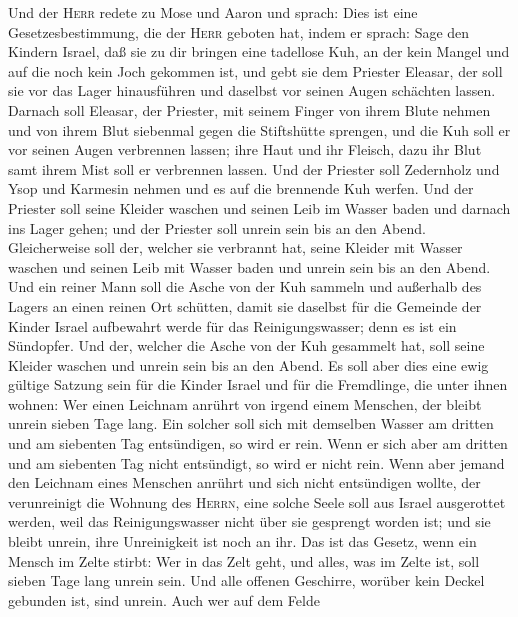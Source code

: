  Und der \textsc{Herr} redete zu Mose und Aaron und
sprach:  Dies ist eine Gesetzesbestimmung, die der
\textsc{Herr} geboten hat, indem er sprach: Sage den Kindern Israel, daß
sie zu dir bringen eine tadellose Kuh, an der kein Mangel und auf die
noch kein Joch gekommen ist, und gebt sie dem Priester Eleasar,
 der soll sie vor das Lager hinausführen und daselbst vor
seinen Augen schächten lassen.  Darnach soll Eleasar, der
Priester, mit seinem Finger von ihrem Blute nehmen und von ihrem Blut
siebenmal gegen die Stiftshütte sprengen,  und die Kuh
soll er vor seinen Augen verbrennen lassen; ihre Haut und ihr Fleisch,
dazu ihr Blut samt ihrem Mist soll er verbrennen lassen. 
Und der Priester soll Zedernholz und Ysop und Karmesin nehmen und es auf
die brennende Kuh werfen.  Und der Priester soll seine
Kleider waschen und seinen Leib im Wasser baden und darnach ins Lager
gehen; und der Priester soll unrein sein bis an den Abend.
 Gleicherweise soll der, welcher sie verbrannt hat, seine
Kleider mit Wasser waschen und seinen Leib mit Wasser baden und unrein
sein bis an den Abend.  Und ein reiner Mann soll die Asche
von der Kuh sammeln und außerhalb des Lagers an einen reinen Ort
schütten, damit sie daselbst für die Gemeinde der Kinder Israel
aufbewahrt werde für das Reinigungswasser; denn es ist ein Sündopfer.
 Und der, welcher die Asche von der Kuh gesammelt hat,
soll seine Kleider waschen und unrein sein bis an den Abend.
 Es soll aber dies eine ewig gültige Satzung sein für die
Kinder Israel und für die Fremdlinge, die unter ihnen wohnen: Wer einen
Leichnam anrührt von irgend einem Menschen, der bleibt unrein sieben
Tage lang.  Ein solcher soll sich mit demselben Wasser am
dritten und am siebenten Tag entsündigen, so wird er rein. Wenn er sich
aber am dritten und am siebenten Tag nicht entsündigt, so wird er nicht
rein.  Wenn aber jemand den Leichnam eines Menschen
anrührt und sich nicht entsündigen wollte, der verunreinigt die Wohnung
des \textsc{Herrn}, eine solche Seele soll aus Israel ausgerottet
werden, weil das Reinigungswasser nicht über sie gesprengt worden ist;
und sie bleibt unrein, ihre Unreinigkeit ist noch an ihr.
 Das ist das Gesetz, wenn ein Mensch im Zelte stirbt: Wer
in das Zelt geht, und alles, was im Zelte ist, soll sieben Tage lang
unrein sein.  Und alle offenen Geschirre, worüber kein
Deckel gebunden ist, sind unrein.  Auch wer auf dem Felde
